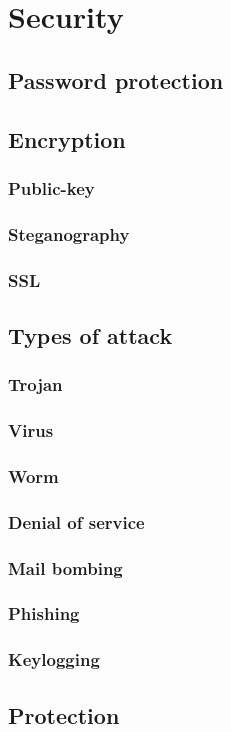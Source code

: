 \documentclass[a4paper,oneside]{report}
\begin{document}
\chapter{Security}
  	\section{Password protection}
	\section{Encryption}
    	\subsection{Public-key}
    	\subsection{Steganography}
    	\subsection{SSL}
  	\section{Types of attack}
    	\subsection{Trojan}
    	\subsection{Virus}
    	\subsection{Worm}
    	\subsection{Denial of service}
    	\subsection{Mail bombing}
    	\subsection{Phishing}
    	\subsection{Keylogging}
  	\section{Protection}
\end{document}
